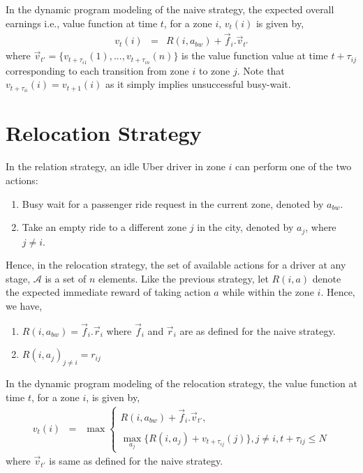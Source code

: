 In the dynamic program modeling of the naive strategy, the expected overall earnings i.e., value function at time $t$, for a zone $i$, $v_t(i)$ is given by,
\begin{eqnarray*}
v_t(i) &=& R(i, a_{bw}) + \vec{f}_i.\vec{v}_{t'}
\end{eqnarray*}
where $\vec{v}_{t'} = \{v_{t + \tau_{i1}}(1), ..., v_{t + \tau_{in}}(n)\}$ is the value function value at time $t + \tau_{ij}$ corresponding to each transition from zone $i$ to zone $j$. Note that $v_{t + \tau_{ii}}(i) = v_{t+1}(i)$ as it simply implies unsuccessful busy-wait.

\section{Relocation Strategy}
In the relation strategy, an idle Uber driver in zone $i$ can perform one of the two actions: 
\begin{enumerate}
    \item Busy wait for a passenger ride request in the current zone, denoted by $a_{bw}$.
    \item Take an empty ride to a different zone $j$ in the city, denoted by $a_j$, where $j \neq i$.
\end{enumerate}
Hence, in the relocation strategy, the set of available actions for a driver at any stage, $\mathcal{A}$ is a set of $n$ elements. Like the previous strategy, let $R(i, a)$ denote the expected immediate reward of taking action $a$ while within the zone $i$. Hence, we have,
\begin{enumerate}
\item $R(i, a_{bw}) = \vec{f}_i.\vec{r}_{i}$ where $\vec{f}_i$ and $\vec{r}_i$ are as defined for the naive strategy.
\item $R(i, a_j)_{j \neq i} = r_{ij}$
\end{enumerate}

In the dynamic program modeling of the relocation strategy, the value function at time $t$, for a zone $i$, is given by,
\begin{eqnarray*}
v_t(i) &=& \max
    \begin{cases}
    R(i, a_{bw}) + \vec{f}_i.\vec{v}_{t'}, \\ \\
    \max_{a_j} \bigg\{R(i,a_j) + v_{t + \tau_{ij}}(j)\bigg\}, j \neq i, t + \tau_{ij} \leq N
    \end{cases}
\end{eqnarray*}
where $\vec{v}_{t'}$ is same as defined for the naive strategy.

